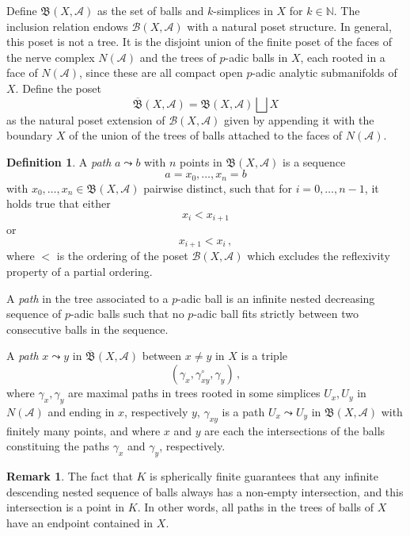 \documentclass[a4paper,draft]{ZbRad}
\theoremstyle{plain}
\theoremstyle{definition}
\newtheorem{rem}{Remark}[section]
\newtheorem{dfn}{Definition}[section]
\numberwithin{equation}{section}
\begin{document}
Define $\mathfrak{B}(X,\mathcal{A})$ as the set of balls and $k$-simplices in $X$ for $k\in\mathbb{N}$. The inclusion relation endows $\mathcal{B}(X,\mathcal{A})$ with a natural poset structure. In general, this poset is not a tree. It is the disjoint union of the finite poset of the  faces of the nerve complex $N(\mathcal{A})$ and the trees of $p$-adic balls in $X$, each  rooted in a face of $N(\mathcal{A})$, since these are all compact open $p$-adic analytic submanifolds of $X$. 
Define the poset
\[
\overline{\mathfrak{B}}(X,\mathcal{A})=\mathfrak{B}(X,\mathcal{A})\bigsqcup X
\]
as the natural poset extension of $\mathcal{B}(X,\mathcal{A})$ given by appending it with the boundary $X$ of the union of the trees of balls attached to the faces of $N(\mathcal{A})$. 


\begin{dfn}
A  \emph{path} $a\leadsto b$ with $n$ points in $\mathfrak{B}(X,\mathcal{A})$ is a sequence
\[
a=x_0,\dots,x_n=b
\]
with $x_0,\dots,x_n\in\mathfrak{B}(X,\mathcal{A})$ pairwise distinct, such that for $i=0,\dots,n-1$, it holds true that either
\[
x_i< x_{i+1}
\]
or 
\[
x_{i+1}< x_i\,,
\]
where $<$ is the ordering of the poset $\mathcal{B}(X,\mathcal{A})$ which excludes the reflexivity property of a partial ordering. 

\smallskip
A \emph{path} in the tree associated to a $p$-adic ball is an infinite nested decreasing sequence of $p$-adic balls such that no $p$-adic ball fits strictly between two consecutive balls in the sequence.  

\smallskip
A \emph{path} $x\leadsto y$ in  $\overline{\mathfrak{B}}(X,\mathcal{A})$ between $x\neq y$ in $X$ is a triple
\[
(\gamma_x,\gamma^\circ_{xy},\gamma_y)\,,
\]
where $\gamma_x,\gamma_y$ are maximal paths in trees rooted in some simplices $U_x,U_y$ in $N(\mathcal{A})$ and ending in $x$, respectively $y$, $\gamma_{xy}$ is a  path $U_x\leadsto U_y$ in $\mathfrak{B}(X,\mathcal{A})$ with finitely many points, and where $x$ and $y$ are each the intersections of the balls constituing the paths $\gamma_x$ and $\gamma_y$, respectively. 
\end{dfn}

\begin{rem}
The fact that $K$ is spherically finite  guarantees that any infinite descending nested sequence of balls always has a non-empty intersection, and this intersection is a point in $K$. In other words, all paths in the trees of balls of $X$ have an endpoint contained in $X$.
\end{rem}
\end{document}
